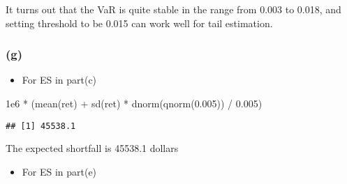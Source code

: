 \documentclass[
]{article}
\newenvironment{Shaded}{\begin{snugshade}}{\end{snugshade}}
\newcommand{\DecValTok}[1]{\textcolor[rgb]{0.00,0.00,0.81}{#1}}
\newcommand{\FloatTok}[1]{\textcolor[rgb]{0.00,0.00,0.81}{#1}}
\newcommand{\FunctionTok}[1]{\textcolor[rgb]{0.00,0.00,0.00}{#1}}
\newcommand{\NormalTok}[1]{#1}
\newcommand{\OtherTok}[1]{\textcolor[rgb]{0.56,0.35,0.01}{#1}}
\newcommand{\SpecialCharTok}[1]{\textcolor[rgb]{0.00,0.00,0.00}{#1}}
\providecommand{\tightlist}{%
  \setlength{\itemsep}{0pt}\setlength{\parskip}{0pt}}
\begin{document}
It turns out that the VaR is quite stable in the range from 0.003 to
0.018, and setting threshold to be 0.015 can work well for tail
estimation.

\hypertarget{g}{%
\subsubsection{(g)}\label{g}}

\begin{itemize}
\tightlist
\item
  For ES in part(c)
\end{itemize}

\begin{Shaded}
\begin{Highlighting}[]
\FloatTok{1e6} \SpecialCharTok{*}\NormalTok{ (}\FunctionTok{mean}\NormalTok{(ret) }\SpecialCharTok{+} \FunctionTok{sd}\NormalTok{(ret) }\SpecialCharTok{*} \FunctionTok{dnorm}\NormalTok{(}\FunctionTok{qnorm}\NormalTok{(}\FloatTok{0.005}\NormalTok{)) }\SpecialCharTok{/} \FloatTok{0.005}\NormalTok{)}
\end{Highlighting}
\end{Shaded}

\begin{verbatim}
## [1] 45538.1
\end{verbatim}

The expected shortfall is 45538.1 dollars

\begin{itemize}
\tightlist
\item
  For ES in part(e)
\end{itemize}

\begin{Shaded}
\end{Shaded}
\end{document}
